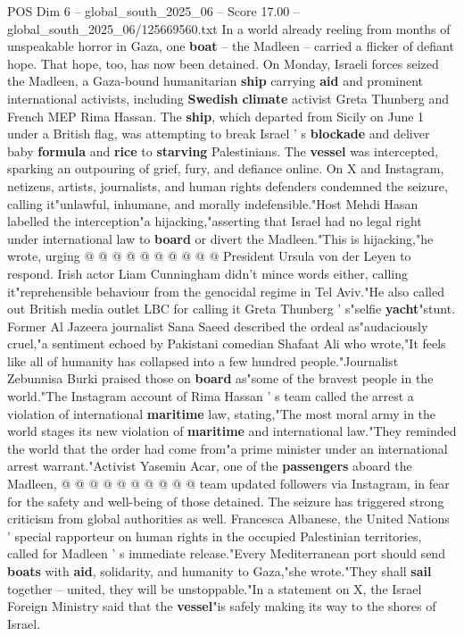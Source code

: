 \begin{textsample}{POS Dim 6 – global\_south\_2025\_06 – Score 17.00 – global\_south\_2025\_06/125669560.txt}  \label{ex:f6_pos_005}
In a world already reeling from months of unspeakable horror in Gaza, one \textbf{boat} -- the Madleen -- carried a flicker of defiant hope.
That hope, too, has now been detained.
On Monday, Israeli forces seized the Madleen, a Gaza-bound humanitarian \textbf{ship} carrying \textbf{aid} and prominent international activists, including \textbf{Swedish} \textbf{climate} activist Greta Thunberg and French MEP Rima Hassan.
The \textbf{ship}, which departed from Sicily on June 1 under a British flag, was attempting to break Israel ' s \textbf{blockade} and deliver baby \textbf{formula} and \textbf{rice} to \textbf{starving} Palestinians.
The \textbf{vessel} was intercepted, sparking an outpouring of grief, fury, and defiance online.
On X and Instagram, netizens, artists, journalists, and human rights defenders condemned the seizure, calling it"unlawful, inhumane, and morally indefensible."Host Mehdi Hasan labelled the interception"a hijacking,"asserting that Israel had no legal right under international law to \textbf{board} or divert the Madleen."This is hijacking,"he wrote, urging @ @ @ @ @ @ @ @ @ @ President Ursula von der Leyen to respond.
Irish actor Liam Cunningham didn't mince words either, calling it"reprehensible behaviour from the genocidal regime in Tel Aviv."He also called out British media outlet LBC for calling it Greta Thunberg ' s"selfie \textbf{yacht}"stunt.
Former Al Jazeera journalist Sana Saeed described the ordeal as"audaciously cruel,"a sentiment echoed by Pakistani comedian Shafaat Ali who wrote,"It feels like all of humanity has collapsed into a few hundred people."Journalist Zebunnisa Burki praised those on \textbf{board} as"some of the bravest people in the world."The Instagram account of Rima Hassan ' s team called the arrest a violation of international \textbf{maritime} law, stating,"The most moral army in the world stages its new violation of \textbf{maritime} and international law."They reminded the world that the order had come from"a prime minister under an international arrest warrant."Activist Yasemin Acar, one of the \textbf{passengers} aboard the Madleen, @ @ @ @ @ @ @ @ @ @ team updated followers via Instagram, in fear for the safety and well-being of those detained.
The seizure has triggered strong criticism from global authorities as well.
Francesca Albanese, the United Nations ' special rapporteur on human rights in the occupied Palestinian territories, called for Madleen ' s immediate release."Every Mediterranean port should send \textbf{boats} with \textbf{aid}, solidarity, and humanity to Gaza,"she wrote."They shall \textbf{sail} together -- united, they will be unstoppable."In a statement on X, the Israel Foreign Ministry said that the \textbf{vessel}"is safely making its way to the shores of Israel.

\end{textsample}
